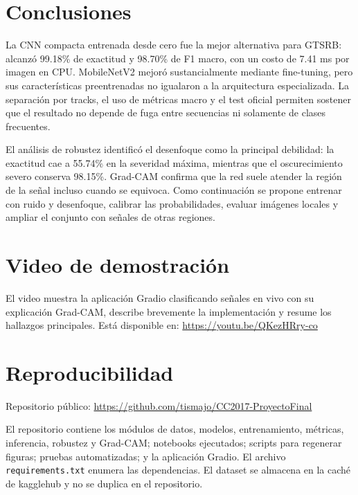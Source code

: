 \documentclass[11pt,letterpaper]{article}
\newcommand{\videourl}{https://youtu.be/QKezHRry-co}
\begin{document}
\section{Conclusiones}

La CNN compacta entrenada desde cero fue la mejor alternativa para GTSRB: alcanz\'o 99.18\% de exactitud y 98.70\% de F1 macro, con un costo de 7.41 ms por imagen en CPU. MobileNetV2 mejor\'o sustancialmente mediante fine-tuning, pero sus caracter\'isticas preentrenadas no igualaron a la arquitectura especializada. La separaci\'on por tracks, el uso de m\'etricas macro y el test oficial permiten sostener que el resultado no depende de fuga entre secuencias ni solamente de clases frecuentes.

El an\'alisis de robustez identific\'o el desenfoque como la principal debilidad: la exactitud cae a 55.74\% en la severidad m\'axima, mientras que el oscurecimiento severo conserva 98.15\%. Grad-CAM confirma que la red suele atender la regi\'on de la se\~nal incluso cuando se equivoca. Como continuaci\'on se propone entrenar con ruido y desenfoque, calibrar las probabilidades, evaluar im\'agenes locales y ampliar el conjunto con se\~nales de otras regiones.

\section*{Video de demostraci\'on}

El video muestra la aplicaci\'on Gradio clasificando se\~nales en vivo con su explicaci\'on Grad-CAM, describe brevemente la implementaci\'on y resume los hallazgos principales. Est\'a disponible en: \url{\videourl}

\section*{Reproducibilidad}

Repositorio p\'ublico: \url{https://github.com/tismajo/CC2017-ProyectoFinal}

El repositorio contiene los m\'odulos de datos, modelos, entrenamiento, m\'etricas, inferencia, robustez y Grad-CAM; notebooks ejecutados; scripts para regenerar figuras; pruebas automatizadas; y la aplicaci\'on Gradio. El archivo \texttt{requirements.txt} enumera las dependencias. El dataset se almacena en la cach\'e de kagglehub y no se duplica en el repositorio.
\end{document}
